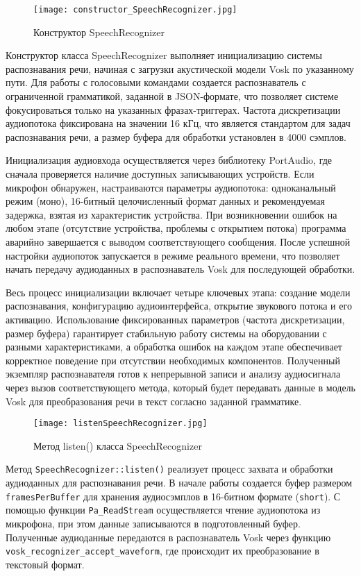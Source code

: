 \begin{figure}[H]
	\centering
	\texttt{[image: constructor\_SpeechRecognizer.jpg]}
	\caption{Конструктор SpeechRecognizer}
\end{figure}

Конструктор класса SpeechRecognizer выполняет инициализацию системы распознавания речи, начиная с загрузки акустической модели Vosk по указанному пути. Для работы с голосовыми командами создается распознаватель с ограниченной грамматикой, заданной в JSON-формате, что позволяет системе фокусироваться только на указанных фразах-триггерах. Частота дискретизации аудиопотока фиксирована на значении 16 кГц, что является стандартом для задач распознавания речи, а размер буфера для обработки установлен в 4000 сэмплов.

Инициализация аудиовхода осуществляется через библиотеку PortAudio, где сначала проверяется наличие доступных записывающих устройств. Если микрофон обнаружен, настраиваются параметры аудиопотока: одноканальный режим (моно), 16-битный целочисленный формат данных и рекомендуемая задержка, взятая из характеристик устройства. При возникновении ошибок на любом этапе (отсутствие устройства, проблемы с открытием потока) программа аварийно завершается с выводом соответствующего сообщения. После успешной настройки аудиопоток запускается в режиме реального времени, что позволяет начать передачу аудиоданных в распознаватель Vosk для последующей обработки.

Весь процесс инициализации включает четыре ключевых этапа: создание модели распознавания, конфигурацию аудиоинтерфейса, открытие звукового потока и его активацию. Использование фиксированных параметров (частота дискретизации, размер буфера) гарантирует стабильную работу системы на оборудовании с разными характеристиками, а обработка ошибок на каждом этапе обеспечивает корректное поведение при отсутствии необходимых компонентов. Полученный экземпляр распознавателя готов к непрерывной записи и анализу аудиосигнала через вызов соответствующего метода, который будет передавать данные в модель Vosk для преобразования речи в текст согласно заданной грамматике.

\begin{figure}[H]
	\centering
	\texttt{[image: listenSpeechRecognizer.jpg]}
	\caption{Метод listen() класса SpeechRecognizer}
\end{figure}

Метод \texttt{SpeechRecognizer::listen()} реализует процесс захвата и обработки аудиоданных для распознавания речи. В начале работы создается буфер размером \texttt{framesPerBuffer} для хранения аудиосэмплов в 16-битном формате (\texttt{short}). С помощью функции \texttt{Pa\_ReadStream} осуществляется чтение аудиопотока из микрофона, при этом данные записываются в подготовленный буфер. Полученные аудиоданные передаются в распознаватель Vosk через функцию \texttt{vosk\_recognizer\_accept\_waveform}, где происходит их преобразование в текстовый формат.

